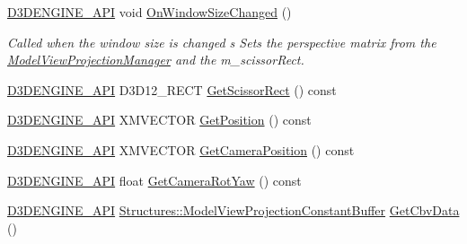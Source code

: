 \begin{DoxyCompactItemize}
\item 
\mbox{\hyperlink{stdafx_8h_a8ee2d990c5dfba7794dd2b60741d7722}{D3\+D\+E\+N\+G\+I\+N\+E\+\_\+\+A\+PI}} void \mbox{\hyperlink{class_camera_helper_a2fc6faa8ce769fdedee3802719c2f372}{On\+Window\+Size\+Changed}} ()
\begin{DoxyCompactList}\small\item\em Called when the window size is changed s Sets the perspective matrix from the \mbox{\hyperlink{class_model_view_projection_manager}{Model\+View\+Projection\+Manager}} and the m\+\_\+scissor\+Rect. \end{DoxyCompactList}\item 
\mbox{\hyperlink{stdafx_8h_a8ee2d990c5dfba7794dd2b60741d7722}{D3\+D\+E\+N\+G\+I\+N\+E\+\_\+\+A\+PI}} D3\+D12\+\_\+\+R\+E\+CT \mbox{\hyperlink{class_camera_helper_a75e575bef9dd1e3f6b2608be1b5f15b7}{Get\+Scissor\+Rect}} () const
\item 
\mbox{\hyperlink{stdafx_8h_a8ee2d990c5dfba7794dd2b60741d7722}{D3\+D\+E\+N\+G\+I\+N\+E\+\_\+\+A\+PI}} X\+M\+V\+E\+C\+T\+OR \mbox{\hyperlink{class_camera_helper_a142721c2285930e8fa5f5674c6196688}{Get\+Position}} () const
\item 
\mbox{\hyperlink{stdafx_8h_a8ee2d990c5dfba7794dd2b60741d7722}{D3\+D\+E\+N\+G\+I\+N\+E\+\_\+\+A\+PI}} X\+M\+V\+E\+C\+T\+OR \mbox{\hyperlink{class_camera_helper_a26e57d260f821f47b9fd5ca456d25e7c}{Get\+Camera\+Position}} () const
\item 
\mbox{\hyperlink{stdafx_8h_a8ee2d990c5dfba7794dd2b60741d7722}{D3\+D\+E\+N\+G\+I\+N\+E\+\_\+\+A\+PI}} float \mbox{\hyperlink{class_camera_helper_a82e6dc2802d286a719c07b3d8484f139}{Get\+Camera\+Rot\+Yaw}} () const
\item 
\mbox{\hyperlink{stdafx_8h_a8ee2d990c5dfba7794dd2b60741d7722}{D3\+D\+E\+N\+G\+I\+N\+E\+\_\+\+A\+PI}} \mbox{\hyperlink{struct_structures_1_1_model_view_projection_constant_buffer}{Structures\+::\+Model\+View\+Projection\+Constant\+Buffer}} \mbox{\hyperlink{class_camera_helper_a52e1cde25a6b6486dc9df5f25ae695d2}{Get\+Cbv\+Data}} ()
\end{DoxyCompactItemize}
